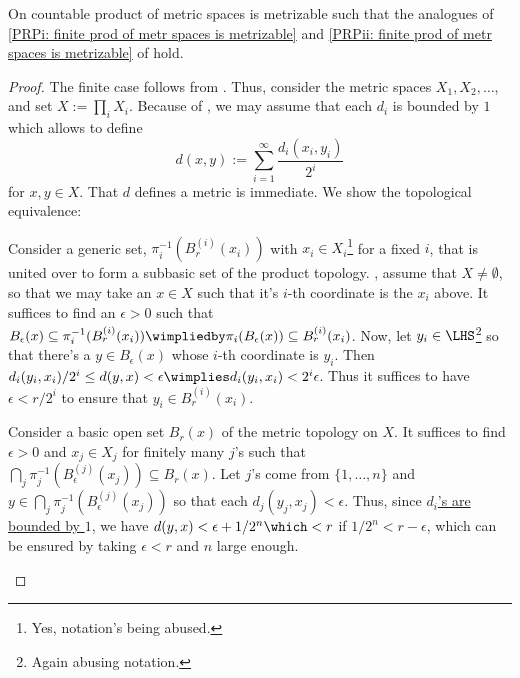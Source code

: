 	
	\begin{prp}\label{PRP: countable prd's of metr spaces are metrizable}
		On countable product of metric spaces is metrizable such that the analogues of \ref{PRPi: finite prod of metr spaces is metrizable} and \ref{PRPii: finite prod of metr spaces is metrizable} of  hold.
	\end{prp}
	
	\begin{proof}
		The finite case follows from . Thus, consider the metric spaces $X_1, X_2, \ldots$, and set $X := \prod_i X_i$. Because of , we may \wlogg assume that each $d_i$ is bounded by $1$ which allows to define
		\[
		d(x, y) := \sum_{i = 1}^\infty \frac{d_i(x_i, y_i)}{2^i}
		\]
		for $x, y\in X$. That $d$ defines a metric is immediate. We show the topological equivalence:
		\begin{prooflist}
			\item Consider a generic set, $\pi_i^{-1}(B^{(i)}_r(x_i))$ with $x_i\in X_i$\footnote{
				Yes, notation's being abused.
			} for a fixed $i$, that is united over to form a subbasic set of the product topology. \Wlogg, assume that $X\ne \emptyset$, so that we may take an $x\in X$ such that it's $i$-th coordinate is the $x_i$ above. It suffices to find an $\epsilon > 0$ such that $B_\epsilon(x)\subseteq \pi_i^{-1}( B^{(i)}_r(x_i) )\wimpliedby \pi_i(B_\epsilon(x))\subseteq B^{(i)}_r(x_i)$. Now, let $y_i\in \LHS$\footnote{
				Again abusing notation.
			} so that there's a $y\in B_\epsilon(x)$ whose $i$-th coordinate is $y_i$. Then $d_i(y_i, x_i)/2^i\le d(y, x) < \epsilon\wimplies d_i(y_i, x_i) < 2^i \epsilon$. Thus it suffices to have $\epsilon < r/2^i$ to ensure that $y_i\in B^{(i)}_r(x_i)$.
			
			\item Consider a basic open set $B_r(x)$ of the metric topology on $X$. It suffices to find $\epsilon > 0$ and $x_j\in X_j$ for finitely many $j$'s such that $\bigcap_j \pi_j^{-1}(B^{(j)}_\epsilon(x_j))\subseteq B_r(x)$. Let $j$'s come from $\{1, \ldots, n\}$ and $y\in \bigcap_j \pi_j^{-1}(B^{(j)}_\epsilon(x_j))$ so that each $d_j(y_j, x_j) < \epsilon$. Thus, since \uline{$d_i$'s are bounded by $1$}, we have $d(y, x) < \epsilon + 1/2^n\which < r$ if $1/2^n < r - \epsilon$, which can be ensured by taking $\epsilon < r$ and $n$ large enough.
		\end{prooflist}
		

\end{proof}
